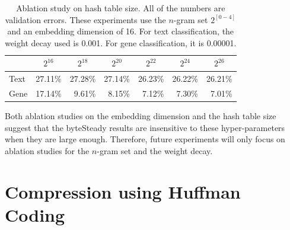 \documentclass{article}
\begin{document}
\begin{table}[h]
  \caption{Ablation study on hash table size. All of the numbers are validation errors. These experiments use the \(n\)-gram set \(2^{[0-4]}\) and an embedding dimension of 16. For text classification, the weight decay used is 0.001. For gene classification, it is 0.00001.}
  \label{tab:hash}
  \begin{center}
    \begin{tabular}{lrrrrrr}
      \hline
      &
      \multicolumn{1}{c}{\(2^{16}\)} &
      \multicolumn{1}{c}{\(2^{18}\)} &
      \multicolumn{1}{c}{\(2^{20}\)} &
      \multicolumn{1}{c}{\(2^{22}\)} & \multicolumn{1}{c}{\(2^{24}\)} & \multicolumn{1}{c}{\(2^{26}\)} \\ \hline
      Text & 27.11\% & 27.28\% & 27.14\% & 26.23\% & 26.22\% & 26.21\% \\
      Gene & 17.14\% & 9.61\% & 8.15\% & 7.12\% & 7.30\% & 7.01\% \\
    \hline
    \end{tabular}
  \end{center}
\end{table}

Both ablation studies on the embedding dimension and the hash table size suggest that the byteSteady results are insensitive to these hyper-parameters when they are large enough. Therefore, future experiments will only focus on ablation studies for the \(n\)-gram set and the weight decay.

\section{Compression using Huffman Coding}
\end{document}
